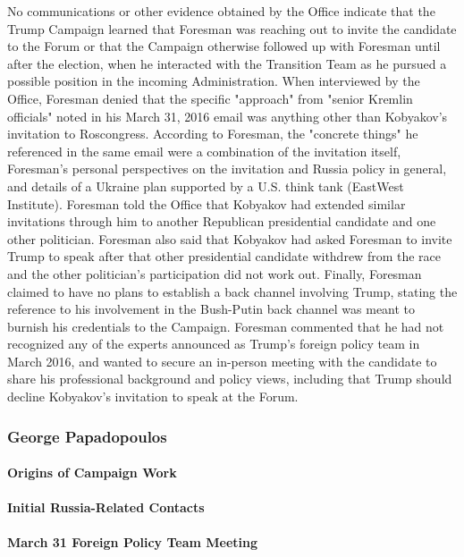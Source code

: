 No communications or other evidence obtained by the Office indicate that the Trump Campaign learned that Foresman was reaching out to invite the candidate to the Forum or that the Campaign otherwise followed up with Foresman until after the election, when he interacted with the Transition Team as he pursued a  possible position in the incoming Administration.%
When interviewed by the Office, Foresman denied that the specific "approach" from "senior Kremlin officials" noted in his March 31, 2016 email was anything other than Kobyakov's invitation to Roscongress.
According to Foresman, the "concrete things" he referenced in the same email were a combination of the invitation itself, Foresman's personal perspectives on the invitation and Russia policy in general, and details of a Ukraine plan supported by a U.S. think tank (EastWest Institute).
Foresman told the Office that Kobyakov had extended similar invitations through him to another Republican presidential candidate and one other politician.
Foresman also said that Kobyakov had asked Foresman to invite Trump to speak after that other presidential candidate withdrew from the race and the other politician's participation did not work out.%
Finally, Foresman claimed to have no plans to establish a back channel involving Trump, stating the reference to his involvement in the Bush-Putin back channel was meant to burnish his credentials to the Campaign.
Foresman commented that he had not recognized any of the experts announced as Trump's foreign policy team in March 2016, and wanted to secure an in-person meeting with the candidate to share his professional background and policy views, including that Trump should decline Kobyakov's invitation to speak at the Forum.%

\subsubsection{George Papadopoulos}

\paragraph{Origins of Campaign Work}

\paragraph{Initial Russia-Related Contacts}

\paragraph{March 31 Foreign Policy Team Meeting}

